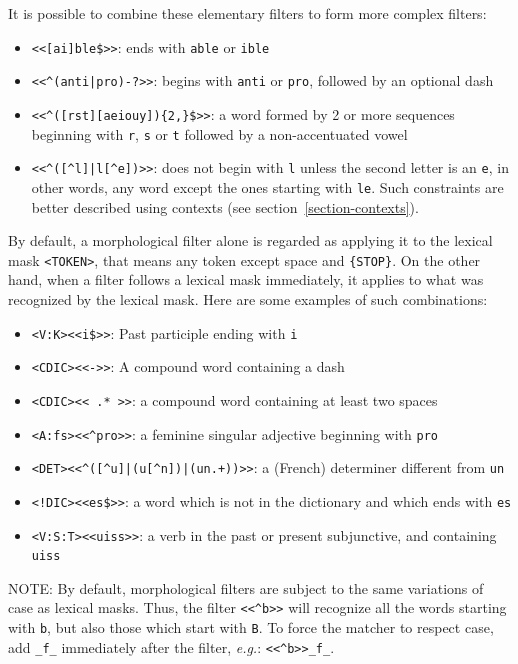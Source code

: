 \bigskip
\noindent It is possible to combine these elementary filters to form more complex filters:

\begin{itemize}
  \item \verb+<<[ai]ble$>>+: ends with \verb$able$ or \verb$ible$
  \item \verb$<<^(anti|pro)-?>>$: begins with \verb$anti$ or \verb$pro$, followed by an optional dash
  \item \verb+<<^([rst][aeiouy]){2,}$>>+: a word formed by 2 or more sequences beginning 
        with \verb$r$, \verb$s$
  or \verb$t$ followed by a non-accentuated vowel
  \item \verb!<<^([^l]|l[^e])>>!: does not begin with \verb$l$ unless the second letter is an
  \verb$e$, in other words, any word except the ones starting with \verb$le$. Such constraints
  are better described using contexts (see section~\ref{section-contexts}).
\end{itemize}

\noindent By default, a morphological filter alone is regarded as applying it to the lexical
mask \verb$<TOKEN>$, that means any token except space and \verb+{STOP}+. On the other hand,
when a filter follows a lexical mask immediately, it applies to what was recognized by the lexical
mask. Here are some examples of such combinations:

\begin{itemize}
  \item \verb+<V:K><<i$>>+: Past participle ending with \verb$i$
  \item \verb!<CDIC><<->>!: A compound word containing a dash
  \item \verb!<CDIC><< .* >>!: a compound word containing at least two spaces
  \item \verb!<A:fs><<^pro>>!: a feminine singular adjective beginning with \verb$pro$
  \item \verb!<DET><<^([^u]|(u[^n])|(un.+))>>!: a (French) determiner different from \verb$un$
  \item \verb+<!DIC><<es$>>+: a word which is not in the dictionary and which ends with \verb$es$
  \item \verb!<V:S:T><<uiss>>!: a verb in the past or present subjunctive, and containing \verb$uiss$
\end{itemize}

\noindent {}NOTE: By default, morphological filters are
subject to the same variations of case as lexical masks. Thus, the filter
\verb$<<^b>>$ will recognize all the words starting with
\texttt{b}, but also those which start with \texttt{B}. 
To force the matcher to respect case, add \verb+_f_+ immediately
after the filter, \textit{e.g.}: \verb+<<^b>>_f_+.



